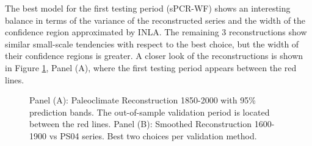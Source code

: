 \documentclass[12pt]{amsart}
\theoremstyle{plain}
\theoremstyle{definition}
\theoremstyle{remark}
\begin{document}
The best model for the first testing period (sPCR-WF) shows an interesting
balance in terms of the variance of the reconstructed series and the width of
the confidence region approximated by INLA. The remaining 3 reconstructions show
similar small-scale tendencies with respect to the best choice, but the width of
their confidence regions is greater. A closer look of the reconstructions is shown in Figure
\ref{fig:paleo19001}, Panel (A), where the first testing period appears between the red lines.
\begin{figure}[h!]
  \centering
  \caption{Panel (A): Paleoclimate Reconstruction 1850-2000 with 95\%
    prediction bands. The out-of-sample validation period is
    located between the red lines. Panel (B): Smoothed Reconstruction 1600-1900 vs PS04 series. Best two choices per validation method.}
  \label{fig:paleo19001}
\end{figure}
\end{document}
